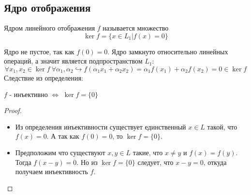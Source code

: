 \subsection{Ядро отображения}
\begin{definition}
    Ядром линейного отображения $f$ называется множество \[
    \ker f = \{x\in L_1 | f(x)=0\}
    \]
\end{definition}
Ядро не пустое, так как $f(0)=0$. Ядро замкнуто относительно линейных операций, а значит является подпространством $L_1$: \[
\forall x_1, x_2 \in \ker f \ \forall \alpha_1, \alpha_2 \hookrightarrow f(\alpha_1 x_1 + \alpha_2  x_2)= \alpha_1 f(x_1) + \alpha_2 f(x_2)=0 \in \ker f
\]
Следствие из определения: 
\begin{proposition}
    \label{prop}
    $f$ - инъективно $\Leftrightarrow$ $\ker f = \{0\}$
\end{proposition}
\begin{proof}
    \begin{itemize}
        \item[$\Rightarrow$] Из определения инъективности существует единственный $x \in L$ такой, что $f(x)=0$. А так как $f(0)=0$, то $\ker f=\{0\}$.
        \item[$\Leftarrow$] Предположим что существуют $x, y\in L$ такие, что $x \neq y$ и $f(x)=f(y)$. Тогда $f(x-y)=0$. Но из $\ker f=\{0\}$ следует, что $x-y=0$, откуда получаем инъективность $f$.
    \end{itemize}
\end{proof}